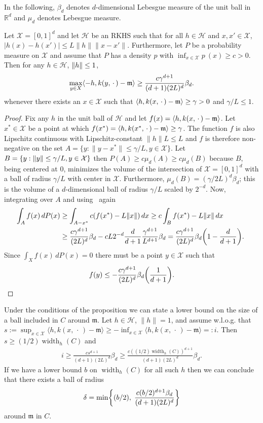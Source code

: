 \documentclass[10pt]{amsart}
\theoremstyle{definition}\newtheorem{defi}[theo]{Definition}\newtheorem{rema}[theo]{Remark}\newtheorem{exam}[theo]{Example}\newtheorem{exem}[theo]{Example}\newtheorem{nota}[theo]{Notation}
\theoremstyle{remark}
\DeclareMathOperator{\diam}{width}
\newcommand{\R}{\mathbb{R}}
\newcommand{\X}{\mathcal{X}}
\newcommand{\cH}{\mathcal{H}}
\newcommand{\mean}{\mathfrak{m}}
\providecommand{\norm}[1]{\left\lVert#1\right\rVert}
\providecommand{\inner}[2]{\left\langle #1,#2\right\rangle}
\let\originalleft\left
\let\originalright\right
\renewcommand{\left}{\mathopen{}\mathclose\bgroup\originalleft}
\renewcommand{\right}{\aftergroup\egroup\originalright}
\begin{document}
In the following, $\beta_d$ denotes $d$-dimensional Lebesgue measure of the unit ball in~$\R^d$ and $\mu_d$ denotes Lebesgue measure.

\begin{prop}\label{prop:Bauer_inspired}
Let $\X = [0,1]^d$ and let $\cH$ be an RKHS such that for all $h\in \cH$ and $x,x' \in \X$, $ | h(x) - h(x')| \leq L \|h\| \|x - x'\|$. Furthermore, let $P$ be a probability measure on $\X$ and assume that $P$ has a density $p$ with $\inf_{x\in \X} p~(x) \geq c > 0$. Then for any $h \in \cH$, $\norm{h} \leq 1$,
\[
\max_{y \in X} \inner{-h}{k(y,\,\cdot\,) - \mean} \geq \frac{c\gamma^{d+1}}{(d+1) (2L)^d} \beta_d.
\]
whenever there exists an $x\in \X$ such that $\inner{h}{k(x,\,\cdot\,)-\mean} \geq \gamma > 0 $ and $\gamma/L \leq 1$.
\end{prop}
\begin{proof}
Fix any $h$ in the unit ball of $\cH$ and let $f(x) = \inner{h}{k(x,\,\cdot\,) - \mean}$. Let $x^*\in \X$ be a point at which $ f(x^*) = \inner{h}{k(x^*,\,\cdot\,)-\mean} \geq \gamma$. The function $f$ is also Lipschitz continuous with Lipschitz-constant $\|h\| L \leq L$ and $f$ is therefore non-negative on the set $A = \{y : \|y-x^*\| \leq \gamma/L, y \in \X\}$. Let $B= \{y: \|y\| \leq \gamma/L,\linebreak y\in \X\}$ then $P(A) \geq c \mu_d(A) \geq c \mu_d(B)$ because $B$, being centered at $0$, minimizes the volume of the intersection of $\X=[0,1]^d$ with a ball of radius $\gamma/L$ with center in $\X$. Furthermore, $\mu_d(B) = (\gamma/2L)^d \beta_d$; this is the volume of a $d$-dimensional ball\pagebreak{} of radius $\gamma/L$ scaled by $2^{-d}$. Now, integrating over $A$ and using~\cite[265G, 265H]{FREM} again
\begin{align*}
\int_A f(x) \,dP(x) &\geq \int_{A-x^*} c (f(x^*) - L\|x\|) \,dx \geq c
\int_{B} f(x^*) - L\|x\| \,dx \\
&\geq \frac{c \gamma^{d+1}}{(2L)^d} \beta_d - cL2^{-d} \frac{d}{d+1} \frac{\gamma^{d+1}}{L^{d+1}} \beta_d = \frac{c\gamma^{d+1}}{(2L)^d} \beta_d \left(1 - \frac{d}{d+1}\right).\
\end{align*}
Since $\int_X f(x) \, dP(x) = 0$ there must be a point $y\in \X$ such that
\[
f(y) \leq -
\frac{c\gamma^{d+1}}{(2L)^d} \beta_d \left(\frac{1}{d+1}\right).\qedhere
\]
\end{proof}

Under the conditions of the proposition we can state a lower bound on the size of a ball included in $C$ around $\mean$. Let $h\in \cH$, $\|h\|=1$, and assume w.l.o.g. that $s := \sup_{x\in \X} \langle h, k(x,\,\cdot\,) - \mean \rangle
\geq - \inf_{x\in \X} \langle h,k(x,\,\cdot\,) - \mean \rangle =: i$. Then $s \geq (1/2) \diam_h(C)$ and
\begin{align}\label{eq:width_lower_bnd}
i \geq \frac{c s^{d+1}}{(d+1) (2L)^d} \beta_d \geq \frac{c ((1/2)\diam_h(C))^{d+1}}{(d+1) (2L)^d} \beta_d.
\end{align}
If we have a lower bound $b$ on $\diam_h(C)$ for all such $h$ then we can conclude that there exists a ball of radius
\[
\delta = \min \left\{(b/2),\; \frac{c (b/2)^{d+1}\beta_d}{(d+1) (2L)^d} \right\}
\]
around $\mean$ in $C$.
\end{document}
